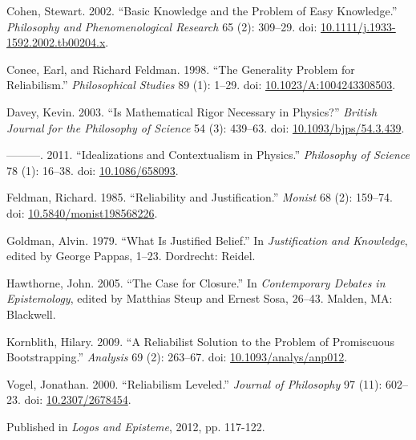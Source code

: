 \documentclass[
  10pt,
  letterpaper,
  DIV=11,
  numbers=noendperiod,
  twoside]{scrartcl}
\newlength{\cslhangindent}
\newenvironment{CSLReferences}[2] %
 {\begin{list}{}{%
  \setlength{\itemindent}{0pt}
  \setlength{\leftmargin}{0pt}
  \setlength{\parsep}{0pt}
  \ifodd #1
   \setlength{\leftmargin}{\cslhangindent}
   \setlength{\itemindent}{-1\cslhangindent}
  \fi
  \setlength{\itemsep}{#2\baselineskip}}}
 {\end{list}}
\begin{document}
\label{refs}
\begin{CSLReferences}{1}{0}
Cohen, Stewart. 2002. {``Basic Knowledge and the Problem of Easy
Knowledge.''} \emph{Philosophy and Phenomenological Research} 65 (2):
309--29. doi:
\href{https://doi.org/10.1111/j.1933-1592.2002.tb00204.x}{10.1111/j.1933-1592.2002.tb00204.x}.

Conee, Earl, and Richard Feldman. 1998. {``The Generality Problem for
Reliabilism.''} \emph{Philosophical Studies} 89 (1): 1--29. doi:
\href{https://doi.org/10.1023/A:1004243308503}{10.1023/A:1004243308503}.

Davey, Kevin. 2003. {``Is Mathematical Rigor Necessary in Physics?''}
\emph{British Journal for the Philosophy of Science} 54 (3): 439--63.
doi:
\href{https://doi.org/10.1093/bjps/54.3.439}{10.1093/bjps/54.3.439}.

---------. 2011. {``Idealizations and Contextualism in Physics.''}
\emph{Philosophy of Science} 78 (1): 16--38. doi:
\href{https://doi.org/10.1086/658093}{10.1086/658093}.

Feldman, Richard. 1985. {``Reliability and Justification.''}
\emph{Monist} 68 (2): 159--74. doi:
\href{https://doi.org/10.5840/monist198568226}{10.5840/monist198568226}.

Goldman, Alvin. 1979. {``What Is Justified Belief.''} In
\emph{Justification and Knowledge}, edited by George Pappas, 1--23.
Dordrecht: Reidel.

Hawthorne, John. 2005. {``The Case for Closure.''} In \emph{Contemporary
Debates in Epistemology}, edited by Matthias Steup and Ernest Sosa,
26--43. Malden, MA: Blackwell.

Kornblith, Hilary. 2009. {``A Reliabilist Solution to the Problem of
Promiscuous Bootstrapping.''} \emph{Analysis} 69 (2): 263--67. doi:
\href{https://doi.org/10.1093/analys/anp012}{10.1093/analys/anp012}.

Vogel, Jonathan. 2000. {``Reliabilism Leveled.''} \emph{Journal of
Philosophy} 97 (11): 602--23. doi:
\href{https://doi.org/10.2307/2678454}{10.2307/2678454}.

\end{CSLReferences}



\noindent Published in\emph{
Logos and Episteme}, 2012, pp. 117-122.
\end{document}
